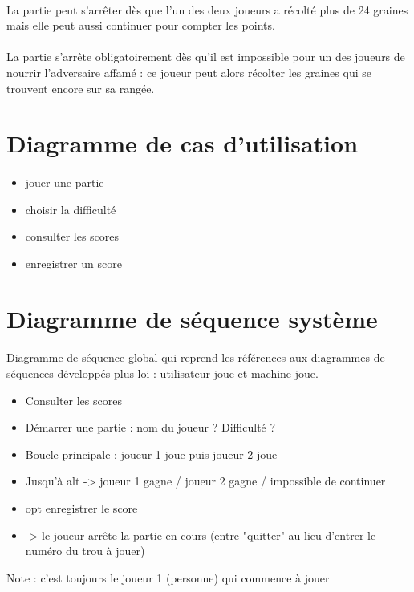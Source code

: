 \documentclass{article}
\begin{document}
    \paragraph{}
    La partie peut s'arrêter dès que l'un des deux joueurs a récolté plus de 24 graines mais elle peut aussi continuer pour compter les points.
    
    \paragraph{}
    La partie s'arrête obligatoirement dès qu'il est impossible pour un des joueurs de nourrir l'adversaire affamé : ce joueur peut alors récolter les graines qui se trouvent encore sur sa rangée.


    \newpage
    \section{Diagramme de cas d'utilisation}

    \paragraph{}
    \begin{itemize}
        \item jouer une partie
        \item choisir la difficulté
        \item consulter les scores
        \item enregistrer un score
    \end{itemize}

    \newpage
    \section{Diagramme de séquence système}
    
    \paragraph{}
    Diagramme de séquence global qui reprend les références aux diagrammes de séquences développés plus loi : utilisateur joue et machine joue.


    \begin{itemize}
        \item Consulter les scores
        \item Démarrer une partie : nom du joueur ? Difficulté ?
        \item Boucle principale : joueur 1 joue puis joueur 2 joue
        \item Jusqu'à alt -> joueur 1 gagne / joueur 2 gagne / impossible de continuer
        \item opt enregistrer le score
        \item -> le joueur arrête la partie en cours (entre "quitter" au lieu d'entrer le numéro du trou à jouer)
    \end{itemize}
    Note : c'est toujours le joueur 1 (personne) qui commence à jouer
\end{document}
